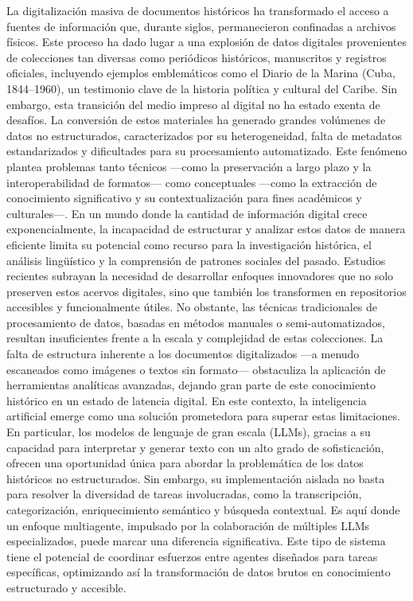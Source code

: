 \introduction

\parskip 10pt  \setlength{\parindent}{0pc}

La digitalización masiva de documentos históricos ha transformado el acceso a fuentes de información que, durante siglos, permanecieron confinadas a archivos físicos. Este proceso ha dado lugar a una explosión de datos digitales provenientes de colecciones tan diversas como periódicos históricos, manuscritos y registros oficiales, incluyendo ejemplos emblemáticos como el Diario de la Marina (Cuba, 1844–1960), un testimonio clave de la historia política y cultural del Caribe. Sin embargo, esta transición del medio impreso al digital no ha estado exenta de desafíos. La conversión de estos materiales ha generado grandes volúmenes de datos no estructurados, caracterizados por su heterogeneidad, falta de metadatos estandarizados y dificultades para su procesamiento automatizado. Este fenómeno plantea problemas tanto técnicos —como la preservación a largo plazo y la interoperabilidad de formatos— como conceptuales —como la extracción de conocimiento significativo y su contextualización para fines académicos y culturales—.
En un mundo donde la cantidad de información digital crece exponencialmente, la incapacidad de estructurar y analizar estos datos de manera eficiente limita su potencial como recurso para la investigación histórica, el análisis lingüístico y la comprensión de patrones sociales del pasado. Estudios recientes subrayan la necesidad de desarrollar enfoques innovadores que no solo preserven estos acervos digitales, sino que también los transformen en repositorios accesibles y funcionalmente útiles. No obstante, las técnicas tradicionales de procesamiento de datos, basadas en métodos manuales o semi-automatizados, resultan insuficientes frente a la escala y complejidad de estas colecciones. La falta de estructura inherente a los documentos digitalizados —a menudo escaneados como imágenes o textos sin formato— obstaculiza la aplicación de herramientas analíticas avanzadas, dejando gran parte de este conocimiento histórico en un estado de latencia digital.
En este contexto, la inteligencia artificial emerge como una solución prometedora para superar estas limitaciones. En particular, los modelos de lenguaje de gran escala (LLMs), gracias a su capacidad para interpretar y generar texto con un alto grado de sofisticación, ofrecen una oportunidad única para abordar la problemática de los datos históricos no estructurados. Sin embargo, su implementación aislada no basta para resolver la diversidad de tareas involucradas, como la transcripción, categorización, enriquecimiento semántico y búsqueda contextual. Es aquí donde un enfoque multiagente, impulsado por la colaboración de múltiples LLMs especializados, puede marcar una diferencia significativa. Este tipo de sistema tiene el potencial de coordinar esfuerzos entre agentes diseñados para tareas específicas, optimizando así la transformación de datos brutos en conocimiento estructurado y accesible.\\
